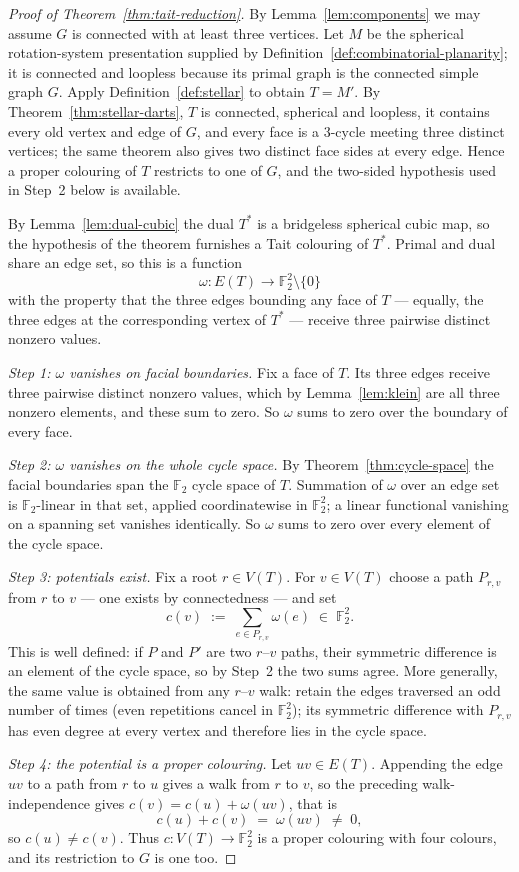 \begin{proof}[Proof of Theorem~\ref{thm:tait-reduction}]
By Lemma~\ref{lem:components} we may assume $G$ is connected with at least
three vertices.  Let $M$ be the spherical rotation-system presentation
supplied by Definition~\ref{def:combinatorial-planarity}; it is connected and
loopless because its primal graph is the connected simple graph $G$.  Apply
Definition~\ref{def:stellar} to obtain $T=M'$.  By
Theorem~\ref{thm:stellar-darts}, $T$ is connected, spherical and loopless, it
contains every old vertex and edge of $G$, and every face is a $3$-cycle
meeting three distinct vertices; the same theorem also gives two distinct
face sides at every edge.  Hence a proper colouring of $T$ restricts to one
of $G$, and the two-sided hypothesis used in Step~2 below is available.

By Lemma~\ref{lem:dual-cubic} the dual $T^{*}$ is a bridgeless spherical
cubic map, so the hypothesis of the theorem furnishes a Tait colouring of
$T^{*}$. Primal and dual share an edge set, so this is a function
\[
  \omega \colon E(T) \longrightarrow \mathbb{F}_2^2 \setminus \{0\}
\]
with the property that the three edges bounding any face of $T$ --- equally,
the three edges at the corresponding vertex of $T^{*}$ --- receive three
pairwise distinct nonzero values.

\emph{Step 1: $\omega$ vanishes on facial boundaries.} Fix a face of $T$. Its
three edges receive three pairwise distinct nonzero values, which by
Lemma~\ref{lem:klein} are all three nonzero elements, and these sum to zero.
So $\omega$ sums to zero over the boundary of every face.

\emph{Step 2: $\omega$ vanishes on the whole cycle space.} By
Theorem~\ref{thm:cycle-space} the facial boundaries span the $\mathbb{F}_2$
cycle space of $T$. Summation of $\omega$ over an edge set is
$\mathbb{F}_2$-linear in that set, applied coordinatewise in
$\mathbb{F}_2^2$; a linear functional vanishing on a spanning set vanishes
identically. So $\omega$ sums to zero over every element of the cycle space.

\emph{Step 3: potentials exist.} Fix a root $r \in V(T)$. For $v \in V(T)$
choose a path $P_{r,v}$ from $r$ to $v$ --- one exists by connectedness ---
and set
\[
  c(v) \;:=\; \sum_{e \in P_{r,v}} \omega(e) \;\in\; \mathbb{F}_2^2 .
\]
This is well defined: if $P$ and $P'$ are two $r$--$v$ paths, their symmetric
difference is an element of the cycle space, so by Step~2 the two sums agree.
More generally, the same value is obtained from any $r$--$v$ walk: retain the
edges traversed an odd number of times (even repetitions cancel in
$\mathbb F_2^2$); its symmetric difference with $P_{r,v}$ has even degree at
every vertex and therefore lies in the cycle space.

\emph{Step 4: the potential is a proper colouring.} Let $uv \in E(T)$.
Appending the edge $uv$ to a path from $r$ to $u$ gives a walk from $r$ to
$v$, so the preceding walk-independence gives
$c(v) = c(u) + \omega(uv)$, that is
\[
  c(u) + c(v) \;=\; \omega(uv) \;\neq\; 0 ,
\]
so $c(u) \neq c(v)$. Thus $c \colon V(T) \to \mathbb{F}_2^2$ is a proper
colouring with four colours, and its restriction to $G$ is one too.
\end{proof}

